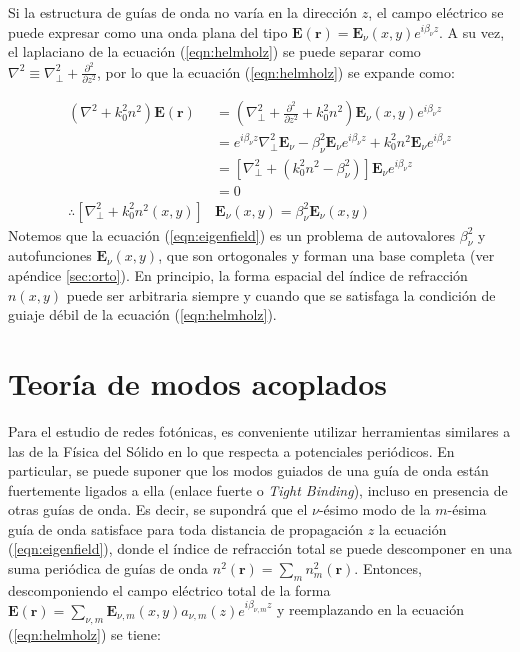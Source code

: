 Si la estructura de guías de onda no varía en la dirección $z$, el campo eléctrico se puede expresar como una onda plana del tipo $\textbf{E}(\textbf{r}) = \textbf{E}_\nu(x, y) e^{i\beta_\nu z}$. A su vez, el laplaciano de la ecuación (\ref{eqn:helmholz}) se puede separar como $\nabla^2 \equiv \nabla_\perp^2 + \frac{\partial^2}{\partial z^2}$, por lo que la ecuación (\ref{eqn:helmholz}) se expande como:

\begin{align}
	(\nabla^2  + k_0^2n^2) \textbf{E}(\textbf{r}) &= \left(\nabla_\perp^2 + \frac{\partial^2}{\partial z^2} + k_0^2n^2\right) \textbf{E}_\nu(x, y)  e^{i\beta_\nu z} \nonumber
\\	
	&= e^{i\beta_\nu z} \nabla_\perp^2 \textbf{E}_\nu -\beta_\nu^2\textbf{E}_\nu e^{i\beta_\nu z} + k_0^2n^2 \textbf{E}_\nu  e^{i\beta_\nu z}
\nonumber	
	\\	
	&= \left[  \nabla_\perp^2  + (k_0^2n^2-\beta_\nu^2) \right]\textbf{E}_\nu  e^{i\beta_\nu z}
	\nonumber	
	\\
	&=
	0
	\nonumber
	\\
	\therefore
	 \left[  \nabla_\perp^2  + k_0^2n^2(x,y) \right]&\textbf{E}_\nu(x,y)  = \beta_\nu^2 \textbf{E}_\nu(x,y) \label{eqn:eigenfield}
\end{align}
Notemos que la ecuación (\ref{eqn:eigenfield}) es un problema de autovalores $\beta_\nu^2$ y autofunciones $\textbf{E}_\nu(x,y)$, que son ortogonales y forman una base completa (ver apéndice \ref{sec:orto}). En principio, la forma espacial del índice de refracción $n(x, y)$ puede ser arbitraria siempre y cuando que se satisfaga la condición de guiaje débil de la ecuación (\ref{eqn:helmholz}). 

\section{Teoría de modos acoplados}
	Para el estudio de redes fotónicas, es conveniente utilizar herramientas similares a las de la Física del Sólido en lo que respecta a potenciales periódicos. En particular, se puede suponer que los modos guiados de una guía de onda están fuertemente ligados a ella (enlace fuerte o \textit{Tight Binding}), incluso en presencia de otras guías de onda. Es decir, se supondrá que el $\nu$-ésimo modo de la $m$-ésima guía de onda satisface para toda distancia de propagación $z$ la ecuación (\ref{eqn:eigenfield}), donde el índice de refracción total se puede descomponer en una suma periódica de guías de onda $n^2(\textbf{r}) = \sum_{m} n^2_m(\textbf{r})$. Entonces, descomponiendo el campo eléctrico total de la forma $\textbf{E}(\textbf{r}) = \sum_{\nu, m} \textbf{E}_{\nu, m}(x, y) a_{\nu, m}(z) e^{i\beta_{\nu, m} z}$ y reemplazando en la ecuación (\ref{eqn:helmholz}) se tiene:

